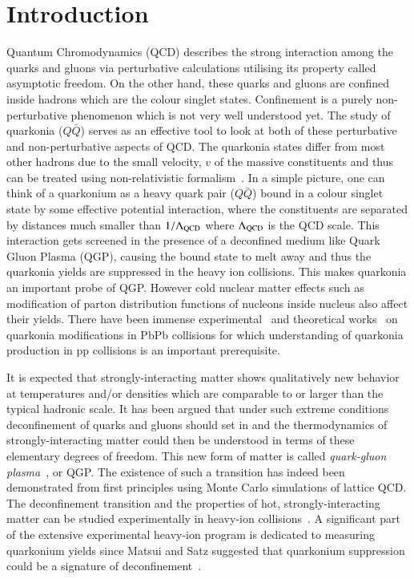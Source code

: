 \section{Introduction}
\label{sec:Introduction}

Quantum Chromodynamics (QCD) describes the strong interaction among the
quarks and gluons via perturbative calculations utilising its property called asymptotic freedom.
On the other hand, these quarks and gluons are confined inside hadrons which are the colour singlet states.
Confinement is a purely non-perturbative phenomenon which is not very well understood yet. 
The study of quarkonia ($Q\bar{Q}$) serves as an effective 
tool to look at  both of these perturbative and non-perturbative aspects of QCD.
The quarkonia states differ from most other hadrons due to the small velocity, $v$ of the massive
constituents and thus can be treated using non-relativistic formalism~\cite{Povh:1995mua,Ikhdair:2005jf}. 
In a simple picture, one can think of a quarkonium as a heavy quark pair ($Q\bar{Q}$) bound
in a colour singlet state by some effective potential interaction, where the constituents are 
separated by distances much smaller than $1/\Lambda_{\rm QCD}$ where $\Lambda_{\rm QCD}$
is the QCD scale. This interaction gets screened 
in the presence of a deconfined medium like Quark Gluon Plasma (QGP), causing 
the bound state to melt away and thus the quarkonia yields are suppressed in the 
heavy ion collisions. This makes quarkonia an important probe of QGP. However cold nuclear matter 
effects such as modification of parton distribution functions of nucleons inside nucleus also 
affect their yields.
There have been immense experimental~\cite{Sirunyan:2017isk,Sirunyan:2018nsz,Acharya:2019iur,Acharya:2018mni}
and theoretical works~\cite{Strickland:2011mw,Song:2011nu,Kumar:2014kfa,Kumar:2019xdj} on
quarkonia modifications in PbPb collisions for which understanding of quarkonia
production in pp collisions is an important prerequisite.


It is expected that strongly-interacting matter shows qualitatively
new behavior at temperatures and/or densities which are
comparable to or larger than the typical hadronic scale.
It has been argued that under such extreme conditions
deconfinement of quarks and gluons should set in and the 
thermodynamics of strongly-interacting matter could then
be understood in terms of these elementary degrees of freedom.
This new form of matter is called
{\em quark-gluon plasma}~\cite{Shuryak:1980tp,Satz:2011wf}, or QGP.
The existence of such a transition has indeed been demonstrated 
from first principles using Monte Carlo simulations of lattice QCD.
The deconfinement transition and the properties of hot, strongly-interacting 
matter can be studied experimentally in heavy-ion collisions~\cite{Satz:2000bn}. 
A significant part of the extensive experimental heavy-ion
program is dedicated to measuring quarkonium yields since Matsui and Satz
suggested that quarkonium suppression could be a signature of 
deconfinement~\cite{Matsui:1986dk}.

